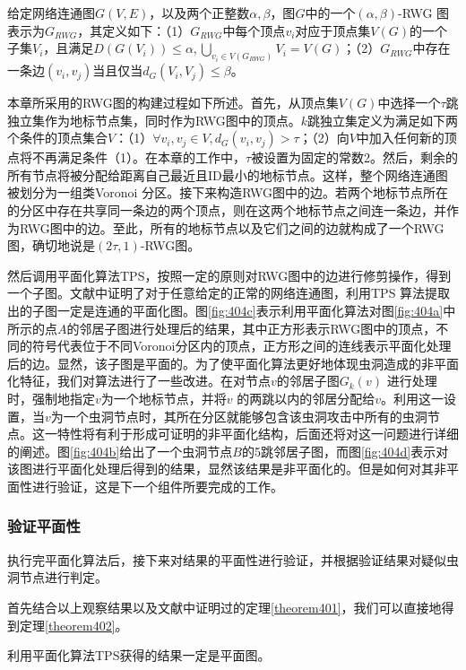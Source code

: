 \begin{definition}\label{def:402}
给定网络连通图$G(V,E)$，以及两个正整数$\alpha,\beta$，图$G$中的一个$(\alpha,\beta)$-RWG 图表示为$G_{RWG}$，其定义如下：（1）$G_{RWG}$中每个顶点$v_i$对应于顶点集$V(G)$的一个子集$V_i$，且满足$D(G(V_i))\le\alpha, \bigcup_{v_i\in{V(G_{RWG})}}V_i=V(G)$；（2）$G_{RWG}$中存在一条边$(v_i,v_j)$当且仅当$d_G(V_i,V_j)\le\beta$。
\end{definition}

本章所采用的RWG图的构建过程如下所述。首先，从顶点集$V(G)$中选择一个$\tau$跳独立集作为地标节点集，同时作为RWG图中的顶点。$k$跳独立集定义为满足如下两个条件的顶点集合$V$：（1）$\forall{v_i,v_j}\in{V}, d_G(v_i,v_j)>\tau$；（2）向$V$中加入任何新的顶点将不再满足条件（1）。在本章的工作中，$\tau$被设置为固定的常数2。然后，剩余的所有节点将被分配给距离自己最近且ID最小的地标节点。这样，整个网络连通图被划分为一组类Voronoi 分区。接下来构造RWG图中的边。若两个地标节点所在的分区中存在共享同一条边的两个顶点，则在这两个地标节点之间连一条边，并作为RWG图中的边。至此，所有的地标节点以及它们之间的边就构成了一个RWG图，确切地说是$(2\tau,1)$-RWG图。

然后调用平面化算法TPS，按照一定的原则对RWG图中的边进行修剪操作，得到一个子图。文献中证明了对于任意给定的正常的网络连通图，利用TPS 算法提取出的子图一定是连通的平面化图。图\ref{fig:404c}表示利用平面化算法对图\ref{fig:404a}中所示的点$A$的邻居子图进行处理后的结果，其中正方形表示RWG图中的顶点，不同的符号代表位于不同Voronoi分区内的顶点，正方形之间的连线表示平面化处理后的边。显然，该子图是平面的。为了使平面化算法更好地体现虫洞造成的非平面化特征，我们对算法进行了一些改进。在对节点$v$的邻居子图$G_k(v)$ 进行处理时，强制地指定$v$为一个地标节点，并将$v$ 的两跳以内的邻居分配给$v$。利用这一设置，当$v$为一个虫洞节点时，其所在分区就能够包含该虫洞攻击中所有的虫洞节点。这一特性将有利于形成可证明的非平面化结构，后面还将对这一问题进行详细的阐述。图\ref{fig:404b}给出了一个虫洞节点$B$的5跳邻居子图，而图\ref{fig:404d}表示对该图进行平面化处理后得到的结果，显然该结果是非平面化的。但是如何对其非平面性进行验证，这是下一个组件所要完成的工作。
\subsubsection{验证平面性}
执行完平面化算法后，接下来对结果的平面性进行验证，并根据验证结果对疑似虫洞节点进行判定。

首先结合以上观察结果以及文献中证明过的定理\ref{theorem401}，我们可以直接地得到定理\ref{theorem402}。
\begin{theorem}
  \label{theorem401}
利用平面化算法TPS获得的结果一定是平面图。
\end{theorem}

